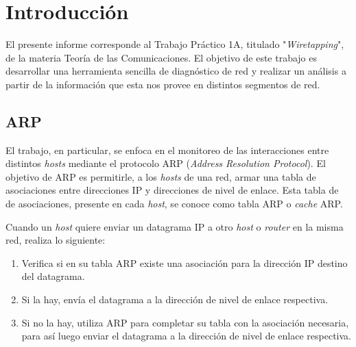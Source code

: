 \documentclass{article}
\begin{document}





\maketitle


\tableofcontents

\newpage

\section{Introducción}
El presente informe corresponde al Trabajo Práctico 1A, titulado
"\emph{Wiretapping}", de la materia Teoría de las Comunicaciones. El objetivo
de este trabajo es desarrollar una herramienta sencilla de diagnóstico de red
y realizar un análisis a partir de la información que esta nos provee en
distintos segmentos de red.

\subsection{ARP}
El trabajo, en particular, se enfoca en el monitoreo de las interacciones
entre distintos \emph{hosts} mediante el protocolo ARP (\emph{Address
Resolution Protocol}). El objetivo de ARP es permitirle, a los \emph{hosts} de
una red, armar una tabla de asociaciones entre direcciones IP y direcciones de
nivel de enlace. Esta tabla de de asociaciones, presente en cada \emph{host},
se conoce como tabla ARP o \emph{cache} ARP.

Cuando un \emph{host} quiere enviar un datagrama IP a otro \emph{host} o
\emph{router} en la misma red, realiza lo siguiente:

\begin{enumerate}
    \item Verifica si en su tabla ARP existe una asociación para la dirección
        IP destino del datagrama.
    \item Si la hay, envía el datagrama a la dirección de nivel de enlace
        respectiva.
    \item Si no la hay, utiliza ARP para completar su tabla con la asociación
        necesaria, para así luego enviar el datagrama a la dirección de nivel
        de enlace respectiva.
\end{enumerate}
\end{document}
